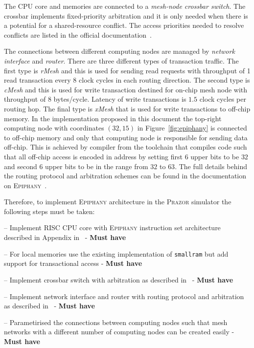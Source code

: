 \documentclass{hitec}
\let\oldmarginpar\marginpar
\renewcommand\marginpar[1]{\-\oldmarginpar[\raggedleft #1]%
{\raggedright #1}}
\newenvironment{checklist}{%
  \begin{list}{}{}%
  \let\olditem\item
  \renewcommand\item{\olditem -- \marginpar{$\Box$} }
  \newcommand\checkeditem{\olditem -- \marginpar{$\CheckedBox$} }
}{%
  \end{list}
}
\begin{document}
The CPU core and memories are connected to a \textit{mesh-node crossbar
  switch}. The crossbar implements fixed-priority arbitration and it is only
needed when there is a potential for a shared-resource conflict. The access
priorities needed to resolve conflicts are listed in the official
documentation~\cite{epiphany}. 

The connections between different computing nodes are managed by \textit{network
interface} and \textit{router}. There are three different types of transaction
traffic. The first type is \textit{rMesh} and this is used for sending read
requests with throughput of 1 read transaction every 8 clock cycles in each
routing direction. The second type is \textit{cMesh} and this is used for write
transaction destined for on-chip mesh node with throughput of 8
bytes/cycle. Latency of write transactions is $1.5$ clock cycles per routing hop. The
final type is \textit{xMesh} that is used for write transactions to off-chip
memory. In the implementation proposed in this document the top-right computing
node with coordinates $(32,15)$ in Figure~\ref{fig:epiphany} is connected to
off-chip memory and only that computing node is responsible for sending data
off-chip. This is achieved by compiler from the toolchain that compiles code
such that all off-chip access is encoded in address by setting first 6 upper bits to
be $32$ and second 6 upper bits to be in the range from $32$ to $63$. The full
details behind the routing protocol and arbitration schemes can be found in the
documentation on \textsc{Epiphany}~\cite{epiphany}. 

Therefore, to implement \textsc{Epiphany} architecture in the \textsc{Prazor}
simulator the following steps must be taken:

\begin{checklist}
\item Implement \textsc{RISC} CPU core with \textsc{Epiphany} instruction set
  architecture described in Appendix in~\cite{epiphany} - \textbf{Must have}
\item For local memories use the existing implementation of \texttt{smallram}
  but add support for transactional access - \textbf{Must have}
\item Implement crossbar switch with arbitration as described in~\cite{epiphany}
  - \textbf{Must have}
\item Implement network interface and router with routing protocol and
  arbitration as described in~\cite{epiphany} - \textbf{Must have}
\item Parametirised the connections between computing nodes such that mesh
  networks with a different number of computing nodes can be created easily -
  \textbf{Must have}
\end{checklist}
\end{document}
